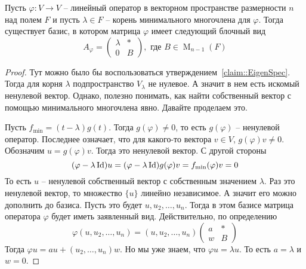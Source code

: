 \begin{claim}
Пусть $\varphi \colon V\to V$ -- линейный оператор в векторном пространстве размерности $n$ над полем $F$ и пусть $\lambda\in F$ -- корень минимального многочлена для $\varphi$.
Тогда существует базис, в котором матрица $\varphi$ имеет следующий блочный вид
\[
A_\varphi = 
\begin{pmatrix}
{\lambda}&{*}\\
{0}&{B}
\end{pmatrix},\text{ где }
B\in \operatorname{M}_{n-1}(F)
\]
\end{claim}
\begin{proof}
Тут можно было бы воспользоваться утверждением~\ref{claim::EigenSpec}.
Тогда для корня $\lambda$ подпространство $V_\lambda$ не нулевое.
А значит в нем есть искомый ненулевой вектор.
Однако, полезно понимать, как найти собственный вектор с помощью минимального многочлена явно.
Давайте проделаем это.

Пусть $f_{\text{min}}=(t-\lambda)g(t)$.
Тогда $g(\varphi) \neq 0$, то есть $g(\varphi)$ -- ненулевой оператор.
Последнее означает, что для какого-то вектора $v\in V$, $g(\varphi)v\neq 0$.
Обозначим $u = g(\varphi)v$.
Тогда это ненулевой вектор.
С другой стороны
\[
(\varphi - \lambda \operatorname{Id})u = (\varphi - \lambda \operatorname{Id})g(\varphi)v = f_\text{min}(\varphi)v = 0
\]
То есть $u$ -- ненулевой собственный вектор с собственным значением $\lambda$.
Раз это ненулевой вектор, то множество $\{u\}$ линейно независимое.
А значит его можно дополнить до базиса.
Пусть это будет $u,u_2,\ldots,u_n$.
Тогда в этом базисе матрица оператора $\varphi$ будет иметь заявленный вид.
Действительно, по определению
\[
\varphi(u, u_2,\ldots, u_n) = (u, u_2,\ldots,u_n)
\begin{pmatrix}
{a}&{*}\\
{w}&{B}
\end{pmatrix}
\]
Тогда $\varphi u = a u + (u_2, \ldots, u_n)w$.
Но мы уже знаем, что $\varphi u = \lambda u$.
То есть $a = \lambda$ и $w = 0$.
\end{proof}

